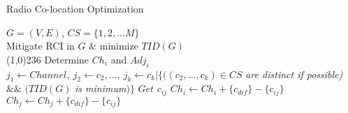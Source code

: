 \documentclass[conference]{IEEEtran}
\begin{document}
\begin{algorithm}[htb!] 
\caption{Radio Co-location Optimization}
\label{radcol}
\begin{algorithmic}[1]
{\fontsize{9}{10}
\REQUIRE$G = (V,E)$, $CS =\{1, 2,...M\}$ \\
\ENSURE Mitigate RCI in $G$ $\&$ minimize $TID(G)$ \\
\line(1,0){236}
\STATE Determine $Ch_i$ and $Adj_i$ 
\ENDFOR
{}
\STATE $j_1\leftarrow Channel, \ j_2\leftarrow c_2,..., \ j_k \leftarrow c_k\lvert\{((c_2,...,c_k)\in CS$ \textit{are distinct if possible)} $\&\&$ $(TID(G)$ \textit{is minimum}$)\}$
\ENDIF
\ENDFOR
{}
\STATE $Get$ $c_{ij}$ 
\STATE 	$Ch_{i}  \leftarrow Ch_{i} + \{c_{dif}\} - \{c_{ij}\}$ 
\STATE 	$Ch_{j}  \leftarrow Ch_{j} + \{c_{dif}\} - \{c_{ij}\}$
\ENDIF
\ENDFOR
\ENDFOR
\ENDFOR
}
\end{algorithmic}
\end{algorithm}
\end{document}
